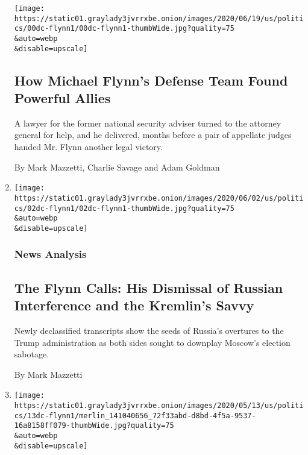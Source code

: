 \begin{enumerate}
  \texttt{[image: https://static01.graylady3jvrrxbe.onion/images/2020/06/19/us/politics/00dc-flynn1/00dc-flynn1-thumbWide.jpg?quality=75\\\&auto=webp\\\&disable=upscale]}

  \hypertarget{how-michael-flynns-defense-team-found-powerful-allies}{%
  \subsection{How Michael Flynn's Defense Team Found Powerful
  Allies}\label{how-michael-flynns-defense-team-found-powerful-allies}}

  A lawyer for the former national security adviser turned to the
  attorney general for help, and he delivered, months before a pair of
  appellate judges handed Mr. Flynn another legal victory.

  By Mark Mazzetti, Charlie Savage and Adam Goldman
\item
  \href{/2020/06/02/us/politics/michael-flynn-kislyak-calls.html}{}

  \texttt{[image: https://static01.graylady3jvrrxbe.onion/images/2020/06/02/us/politics/02dc-flynn1/02dc-flynn1-thumbWide.jpg?quality=75\\\&auto=webp\\\&disable=upscale]}

  \hypertarget{news-analysis-1}{%
  \subsubsection{News Analysis}\label{news-analysis-1}}

  \hypertarget{the-flynn-calls-his-dismissal-of-russian-interference-and-the-kremlins-savvy}{%
  \subsection{The Flynn Calls: His Dismissal of Russian Interference and
  the Kremlin's
  Savvy}\label{the-flynn-calls-his-dismissal-of-russian-interference-and-the-kremlins-savvy}}

  Newly declassified transcripts show the seeds of Russia's overtures to
  the Trump administration as both sides sought to downplay Moscow's
  election sabotage.

  By Mark Mazzetti
\item
  \href{/2020/05/14/us/politics/trump-michael-flynn.html}{}

  \texttt{[image: https://static01.graylady3jvrrxbe.onion/images/2020/05/13/us/politics/13dc-flynn1/merlin\_141040656\_72f33abd-d8bd-4f5a-9537-16a8158ff079-thumbWide.jpg?quality=75\\\&auto=webp\\\&disable=upscale]}


\end{enumerate}
